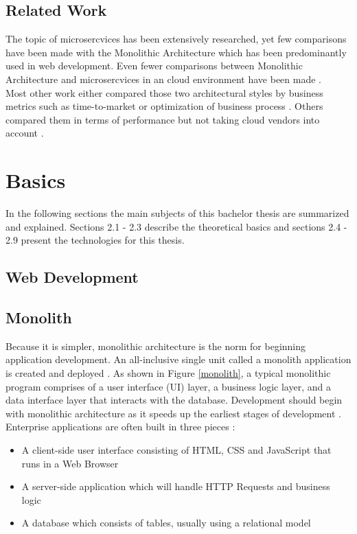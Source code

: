 \documentclass[BIF,Bachelor,nenglish]{twbook}%
\begin{document}
\section{Related Work}
The topic of microsercvices has been extensively researched, yet few comparisons have been made with the Monolithic Architecture which has been predominantly used in web development. Even fewer comparisons between Monolithic Architecture and microsercvices in an cloud environment have been made \cite{vil2015, vil2016}.
\\
Most other work either compared those two architectural styles by business metrics \cite{frommonotomicro} such as time-to-market or optimization of business process \cite{whycompanies}. Others compared them in terms of performance but not taking cloud vendors into account \cite{comp, flygare, compmonomicro}.

\chapter{Basics}
In the following sections the main subjects of this bachelor thesis are summarized and explained. Sections 2.1 - 2.3 describe the theoretical basics and sections 2.4 - 2.9 present the technologies for this thesis.

\section{Web Development}


\section{Monolith}
Because it is simpler, monolithic architecture is the norm for beginning application development. An all-inclusive single unit called a monolith application is created and deployed \cite{comp}. As shown in Figure \ref{monolith}, a typical monolithic program comprises of a user interface (UI) layer, a business logic layer, and a data interface layer that interacts with the database. Development should begin with monolithic architecture as it speeds up the earliest stages of development \cite{chllng}.
\\
Enterprise applications are often built in three pieces \cite{fow2014}:
\begin{itemize}
  \item A client-side user interface consisting of HTML, CSS and JavaScript that runs in a Web Browser
  \item A server-side application which will handle HTTP Requests and business logic
  \item A database which consists of tables, usually using a relational model
\end{itemize}
\end{document}
